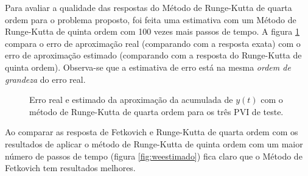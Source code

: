 \documentclass[final,5p]{elsarticle}
\numberwithin{equation}{section}
\begin{document}
        Para avaliar a qualidade das respostas do Método de Runge-Kutta de quarta ordem para o problema proposto, foi feita uma estimativa com um Método de Runge-Kutta de quinta ordem com 100 vezes mais passos de tempo. A figura \ref{fig:testeerro} compara o erro de aproximação real (comparando com a resposta exata) com o erro de aproximação estimado (comparando com a resposta do Runge-Kutta de quinta ordem). Observa-se que a estimativa de erro está na mesma \emph{ordem de grandeza} do erro real.

        \begin{figure}[hbt!]
            \caption{Erro real e estimado da aproximação da acumulada de $y(t)$ com o método de Runge-Kutta de quarta ordem para os três PVI de teste.}
            \label{fig:testeerro}
        \end{figure}

        Ao comparar as resposta de Fetkovich e Runge-Kutta de quarta ordem com os resultados de aplicar o método de Runge-Kutta de quinta ordem com um maior número de passos de tempo (figura \ref{fig:weestimado}) fica claro que o Método de Fetkovich tem resultados melhores.
\end{document}
